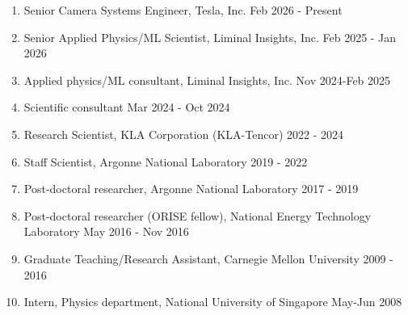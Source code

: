 \begin{enumerate}
    \item Senior Camera Systems Engineer, Tesla, Inc. \hfill Feb 2026 - Present
    \item Senior Applied Physics/ML Scientist, Liminal Insights, Inc. \hfill Feb 2025 - Jan 2026
    \item Applied physics/ML consultant, Liminal Insights, Inc. \hfill Nov 2024-Feb 2025
    \item Scientific consultant \hfill Mar 2024 - Oct 2024
    \item Research Scientist, KLA Corporation (KLA-Tencor) \hfill 2022 - 2024
    \item Staff Scientist, Argonne National Laboratory \hfill 2019 - 2022
    \item Post-doctoral researcher, Argonne National Laboratory \hfill 2017 - 2019
    \item Post-doctoral researcher (ORISE fellow), National Energy Technology Laboratory  \hfill May 2016 - Nov 2016
    \item Graduate Teaching/Research Assistant, Carnegie Mellon University \hfill 2009 - 2016
    \item Intern, Physics department, National University of Singapore \hfill May-Jun 2008 
\end{enumerate}